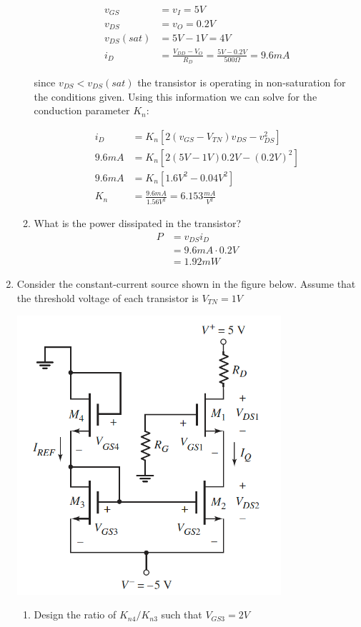 \documentclass{article}
\begin{document}
\begin{enumerate}
\begin{enumerate}
\begin{align}
            v_{GS} &= v_I = 5V\\
            v_{DS} &= v_O = 0.2V\\
            v_{DS}(sat) &= 5V - 1V = 4V\\
            i_D &= \frac{V_{DD}-V_O}{R_D} = \frac{5V-0.2V}{500\Omega} = 9.6mA
        \end{align}
        \begin{center}
            since $v_{DS}<v_{DS}(sat)$ the transistor is operating in non-saturation for the conditions given. Using this information we can solve for the conduction parameter $K_n$:
        \end{center}
        \begin{align}
            i_D &= K_n[2(v_{GS} - V_{TN})v_{DS}- v_{DS}^2]\\
            9.6mA &= K_n[2(5V - 1V)0.2V- (0.2V)^2]\\
            9.6mA &= K_n[1.6V^2- 0.04V^2]\\
            K_n &=\frac{9.6mA}{1.56V^2} = \boxed{6.153\frac{mA}{V^2}}
        \end{align}
        \item What is the power dissipated in the transistor?
        \begin{align}
            P &= v_{DS}i_D\\ 
            &= 9.6mA\cdot0.2V\\ 
            &= \boxed{1.92mW}
        \end{align}
    \end{enumerate}
    \newpage
    \item  Consider the constant-current source shown in the figure below. Assume that the threshold voltage of each transistor is $V_{TN} = 1V$
    \begin{center}
        \includegraphics[width = .3\textwidth]{p8.png}
    \end{center}
    \begin{enumerate}
        \item Design the ratio of $K_{n4}/K_{n3}$ such that $V_{GS3} = 2V$
        \begin{align}

\end{align}
\end{enumerate}
\end{enumerate}
\end{document}
